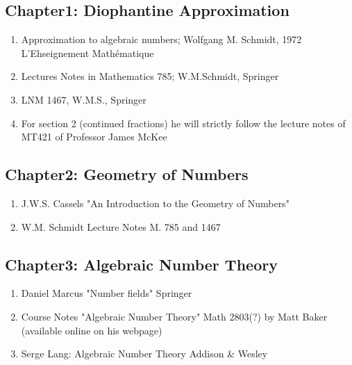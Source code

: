 \documentclass[a4paper]{article}
\begin{document}
\subsection{Chapter1: Diophantine Approximation}
\begin{enumerate}
  \item Approximation to algebraic numbers; Wolfgang M. Schmidt, 1972 L'Ehseignement Mathématique
  \item Lectures Notes in Mathematics 785; W.M.Schmidt, Springer
  \item LNM 1467, W.M.S., Springer
  \item For section 2 (continued fractions) he will strictly follow the lecture notes of MT421 of Professor James McKee
\end{enumerate}

\subsection{Chapter2: Geometry of Numbers}
\begin{enumerate}
  \item J.W.S. Cassels "An Introduction to the Geometry of Numbers"
  \item W.M. Schmidt Lecture Notes M. 785 and 1467
\end{enumerate}

\subsection{Chapter3: Algebraic Number Theory}
\begin{enumerate}
  \item Daniel Marcus "Number fields" Springer
  \item Course Notes "Algebraic Number Theory" Math 2803(?) by Matt Baker (available online on his webpage)
  \item Serge Lang: Algebraic Number Theory Addison \& Wesley
\end{enumerate}



%
%

%
%

%
%

%
%
\end{document}
